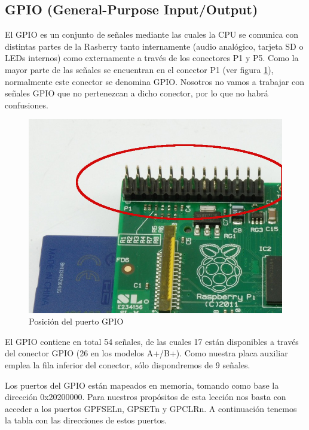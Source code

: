 \subsection{GPIO (General-Purpose Input/Output)}

El GPIO es un conjunto de señales mediante las cuales la CPU se comunica con distintas partes
de la Rasberry tanto internamente (audio analógico, tarjeta SD o LEDs internos) como
externamente a través de los conectores P1 y P5. Como la mayor parte de las señales se
encuentran en el conector P1 (ver figura \ref{fig:posiciongpio}), normalmente este conector se denomina GPIO. Nosotros
no vamos a trabajar con señales GPIO que no pertenezcan a dicho conector, por lo que no
habrá confusiones.

\begin{figure}[h]
  \centering
    \includegraphics[width=14cm]{graphs/posiciongpio.jpg}
  \caption{Posición del puerto GPIO}
  \label{fig:posiciongpio}
\end{figure}

El GPIO contiene en total 54 señales, de las cuales 17 están disponibles a través del conector
GPIO (26 en los modelos A+/B+). Como nuestra placa auxiliar emplea la fila inferior
del conector, sólo dispondremos de 9 señales.

Los puertos del GPIO están mapeados en memoria, tomando como base la dirección 0x20200000.
Para nuestros propósitos de esta lección nos basta con acceder a los puertos GPFSELn,
GPSETn y GPCLRn. A continuación tenemos la tabla con las direcciones de estos puertos.

